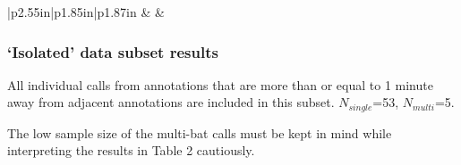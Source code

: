 \documentclass[
]{book}
\begin{document}
\begin{table}
\begin{longtable}{|p{2.55in}|p{1.85in}|p{1.87in}}
 &  &  \\

\noalign{\global\setlength{\arrayrulewidth}{2pt}}

\end{longtable}

\end{table}

\hypertarget{isolated-data-subset-results}{%
\subsubsection{`Isolated' data subset results}\label{isolated-data-subset-results}}

All individual calls from annotations that are more than or equal to 1 minute away from adjacent annotations are included in this subset. \(N_{single}\)=53, \(N_{multi}\)=5.

The low sample size of the multi-bat calls must be kept in mind while interpreting the results in Table 2 cautiously.

\providecommand{\docline}[3]{\noalign{\global\setlength{\arrayrulewidth}{#1}}\arrayrulecolor[HTML]{#2}\cline{#3}}

\setlength{\tabcolsep}{8pt}

\renewcommand*{\arraystretch}{1.5}
\end{document}
